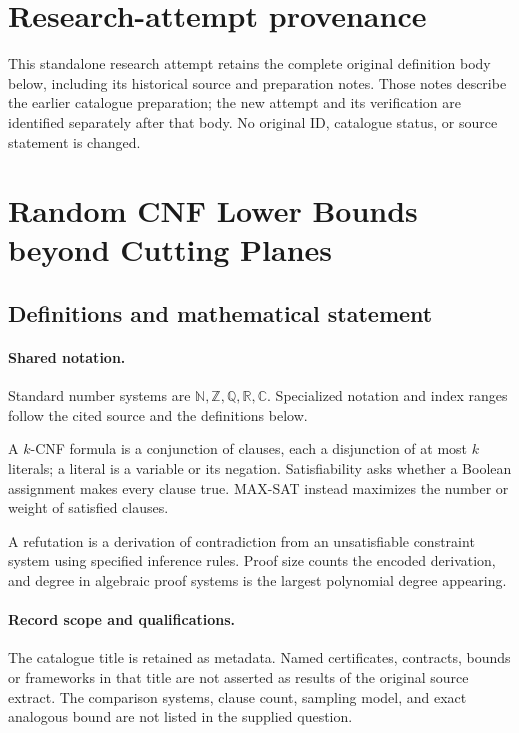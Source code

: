 \documentclass[11pt]{article}
\begin{document}
\section*{Research-attempt provenance}
This standalone research attempt retains the complete original definition body below,
including its historical source and preparation notes. Those notes describe the
earlier catalogue preparation; the new attempt and its verification are identified
separately after that body. No original ID, catalogue status, or source statement is changed.

\section{Random CNF Lower Bounds beyond Cutting Planes}\label{statement}

\subsection{Definitions and mathematical statement}

\paragraph{Shared notation.}Standard number systems are $\mathbb N,\mathbb Z,\mathbb Q,\mathbb R,\mathbb C$. Specialized notation and index ranges follow the cited source and the definitions below.


A $k$-CNF formula is a conjunction of clauses, each a disjunction of at most $k$ literals; a literal is a variable or its negation. Satisfiability asks whether a Boolean assignment makes every clause true. MAX-SAT instead maximizes the number or weight of satisfied clauses.

A refutation is a derivation of contradiction from an unsatisfiable constraint system using specified inference rules. Proof size counts the encoded derivation, and degree in algebraic proof systems is the largest polynomial degree appearing.
\paragraph{Record scope and qualifications.}
The catalogue title is retained as metadata. Named certificates, contracts, bounds or frameworks in that title are not asserted as results of the original source extract.
The comparison systems, clause count, sampling model, and exact analogous bound are not listed in the supplied question.
\end{document}
